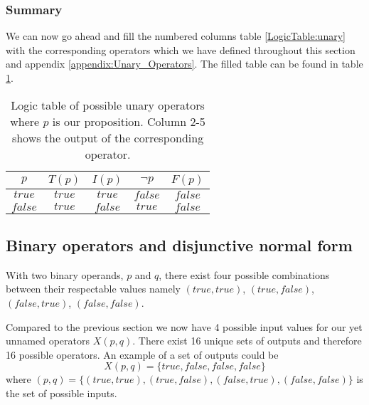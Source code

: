             \subsubsection{Summary}
                
                We can now go ahead and fill the numbered columns table \ref{LogicTable:unary} with the corresponding operators which we have defined throughout this section and appendix \ref{appendix:Unary_Operators}. The filled table can be found in table \ref{LogicTable:unaryfilled}. 
                
                \begin{table}[h!]
                    \centering
                    \begin{tabular}{|c||c|c|c|c|}
                    	\hline
                    	  $p$   & $T(p)$ & $I(p)$  & $\neg p$ & $F(p)$  \\ \hline
                    	$true$  & $true$ & $true$  & $false$  & $false$ \\ \hline
                    	$false$ & $true$ & $false$ &  $true$  & $false$ \\ \hline
                    \end{tabular}
                    \caption{Logic table of possible unary operators where $p$ is our proposition. Column 2-5 shows the output of the corresponding operator.}
                    \label{LogicTable:unaryfilled}
                \end{table} 
                
                 
\newpage        
        \subsection{Binary operators and disjunctive normal form}\label{DNF}
        
            With two binary operands, $p$ and $q$, there exist four possible combinations between their respectable values namely $(true, true)$, $(true, false)$, $(false, true)$, $(false, false)$.
            
            Compared to the previous section we now have 4 possible input values for our yet unnamed operators $X(p, q)$. There exist 16 unique sets of outputs and therefore 16 possible operators. An example of a set of outputs could be 
            \begin{equation}
                X(p, q) =\{true, false, false, false\}
            \end{equation}
            where $(p, q) = \{(true, true), (true, false), (false, true), (false, false)\}$ is the set of possible inputs. 
            

